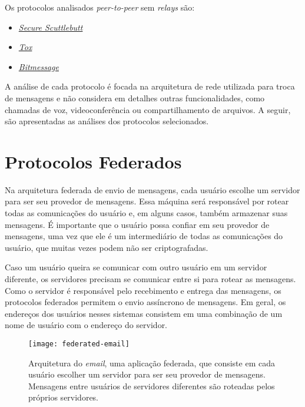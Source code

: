 Os protocolos analisados \textit{peer-to-peer} sem \textit{relays} são:
\begin{itemize}
  \item \href{https://scuttlebutt.nz/}{\textit{Secure Scuttlebutt}}
  \item \href{https://tox.chat/}{\textit{Tox}}
  \item \href{https://bitmessage.org/}{\textit{Bitmessage}}
\end{itemize}

A análise de cada protocolo é focada na arquitetura de rede utilizada para troca de mensagens e não considera em detalhes outras funcionalidades, como chamadas de voz, videoconferência ou compartilhamento de arquivos. A seguir, são apresentadas as análises dos protocolos selecionados.

\section{Protocolos Federados}

Na arquitetura federada de envio de mensagens, cada usuário escolhe um servidor para ser seu provedor de mensagens. Essa máquina será responsável por rotear todas as comunicações do usuário e, em alguns casos, também armazenar suas mensagens. É importante que o usuário possa confiar em seu provedor de mensagens, uma vez que ele é um intermediário de todas as comunicações do usuário, que muitas vezes podem não ser criptografadas.

Caso um usuário queira se comunicar com outro usuário em um servidor diferente, os servidores precisam se comunicar entre si para rotear as mensagens. Como o servidor é responsável pelo recebimento e entrega das mensagens, os protocolos federados permitem o envio assíncrono de mensagens. Em geral, os endereços dos usuários nesses sistemas consistem em uma combinação de um nome de usuário com o endereço do servidor.

\begin{figure}
  \centering
  \texttt{[image: federated-email]}

  \caption{Arquitetura do \textit{email}, uma aplicação federada, que consiste em cada usuário escolher um servidor para ser seu provedor de mensagens. Mensagens entre usuários de servidores diferentes são roteadas pelos próprios servidores. \cite{email-picture}}
  \label{fig:federated-email}
\end{figure}


